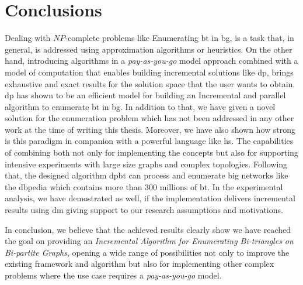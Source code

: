 \section{Conclusions}
Dealing with $NP$-complete problems like Enumerating \acrlong{bt} in \acrlong{bg}, is a task that, in general, is addressed using approximation algorithms or heuristics. 
On the other hand, introducing algorithms in a \emph{pay-as-you-go} model approach combined with a model of computation that enables building incremental solutions like \acrshort{dp}, brings exhaustive and exact results for the solution space that the user wants to obtain.    
\acrfull{dp} has shown to be an efficient model for building an Incremental and parallel algorithm to enumerate \acrlong{bt} in \acrlong{bg}. 
In addition to that, we have given a novel solution for the enumeration problem which has not been addressed in any other work at the time of writing this thesis.
Moreover, we have also shown how strong is this paradigm in companion with a powerful language like \acrfull{hs}. The capabilities of combining both not only for implementing the concepts but also for supporting intensive experiments with large size graphs and complex topologies. 
Following that, the designed algorithm \acrshort{dpbt} can process and enumerate big networks like the \acrlong{dbpedia} which contains more than $300$ millions of \acrlong{bt}.
In the experimental analysis, we have demostrated as well, if the implementation delivers incremental results using \acrlong{dm} giving support to our research assumptions and motivations. 

In conclusion, we believe that the achieved results clearly show we have reached the goal on providing an \emph{Incremental Algorithm for Enumerating Bi-triangles on Bi-partite Graphs}, opening a wide range of possibilities not only to improve the existing framework and algorithm but also for implementing other complex problems where the use case requires a \emph{pay-as-you-go} model.

